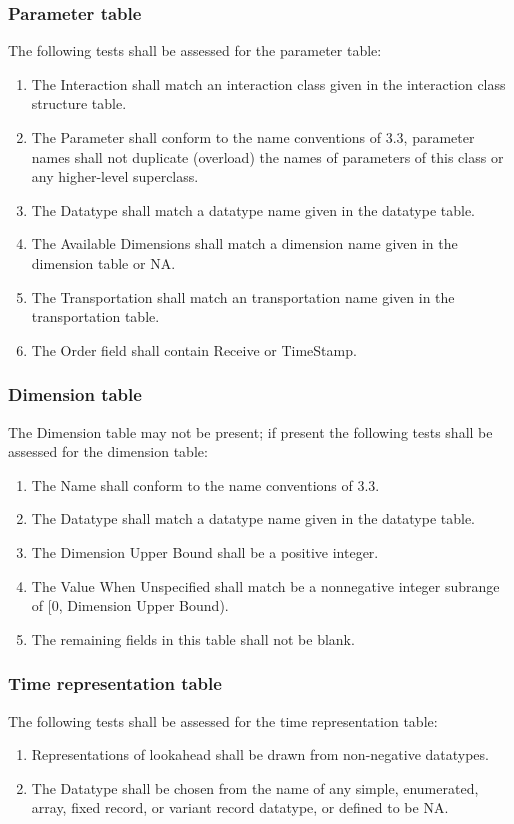 \subsubsection{Parameter table}
The following tests shall be assessed for the parameter table:
\begin{enumerate}[label=\arabic*),leftmargin=42pt,labelsep=8pt,itemsep=1.2pt,topsep=2pt]
\item The Interaction shall match an interaction class given in the interaction class structure table.
\item The Parameter shall conform to the name conventions of 3.3, parameter names shall not duplicate (overload) the names of parameters of this class or any higher-level superclass.
\item The Datatype shall match a datatype name given in the datatype table.
\item The Available Dimensions shall match a dimension name given in the dimension table or NA.
\item The Transportation shall match an transportation name given in the transportation table.
\item The Order field shall contain Receive or TimeStamp.
\end{enumerate}

\subsubsection{Dimension table}
The Dimension table may not be present; if present the following tests shall be assessed for the dimension table:
\begin{enumerate}[label=\arabic*),leftmargin=42pt,labelsep=8pt,itemsep=1.2pt,topsep=2pt]
\item The Name shall conform to the name conventions of 3.3.
\item The Datatype shall match a datatype name given in the datatype table.
\item The Dimension Upper Bound shall be a positive integer.
\item The Value When Unspecified shall match be a nonnegative integer subrange of [0, Dimension Upper Bound).
\item The remaining fields in this table shall not be blank.
\end{enumerate}

\subsubsection{Time representation table}
The following tests shall be assessed for the time representation table:
\begin{enumerate}[label=\arabic*),leftmargin=42pt,labelsep=8pt,itemsep=1.2pt,topsep=2pt]
\item Representations of lookahead shall be drawn from non-negative datatypes.
\item The Datatype shall be chosen from the name of any simple, enumerated, array, fixed record, or variant record datatype, or defined to be NA.
\end{enumerate}

